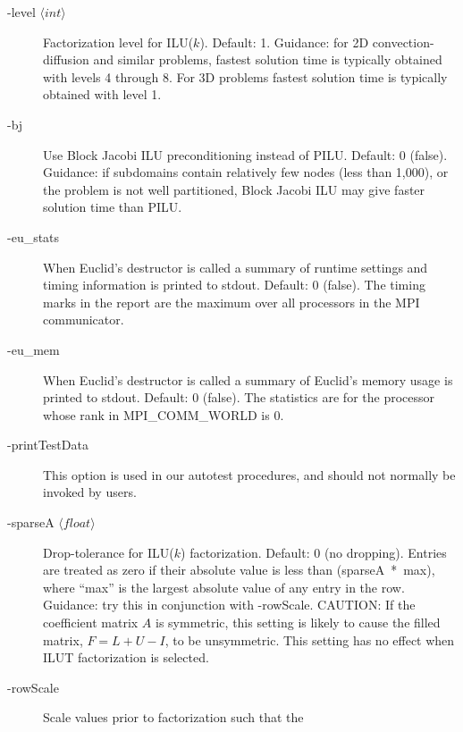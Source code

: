 \begin{description}
\item[-level $\langle int \rangle$] Factorization level for ILU($k$).  
           Default: 1.
           Guidance: for 2D convection-diffusion and similar problems, 
           fastest solution time is typically obtained with levels 4 through
           8.  For 3D problems fastest solution time is typically 
           obtained with level 1.
                    
\item[-bj] Use Block Jacobi ILU preconditioning instead of PILU.
           Default: 0 (false). Guidance: if subdomains contain
           relatively few nodes (less than 1,000), or the problem is
           not well partitioned, Block Jacobi ILU 
           may give faster solution time than PILU.
\item[-eu\_stats] When Euclid's destructor is called a summary of
                 runtime settings and timing information is printed
                 to stdout.  Default: 0 (false).
                 The timing marks in the report are the maximum over 
                 all processors in the MPI communicator.
\item[-eu\_mem] When Euclid's destructor is called a summary of
               Euclid's memory usage is printed to stdout.
               Default: 0 (false).
               The statistics are for the processor whose rank 
               in MPI\_COMM\_WORLD is 0.
\item[-printTestData] This option is used in our autotest procedures,
                 and should not normally be invoked by users.
\item[-sparseA $\langle float \rangle$] Drop-tolerance for ILU($k$) factorization.
                        Default: 0 (no dropping).
                        Entries are treated as zero if their absolute
                        value is less than \mbox{(sparseA * max)}, where ``max''
                        is the largest absolute value of any entry in the
                        row. Guidance: try this in conjunction with 
                        -rowScale.  CAUTION: If the coefficient matrix $A$ is 
                        symmetric, this
                        setting is likely to cause the filled matrix,
                        $F = L+U-I$, to be unsymmetric.
                        This setting has no effect when ILUT factorization
                        is selected.
\item[-rowScale] Scale values prior to factorization such that the

\end{description}

